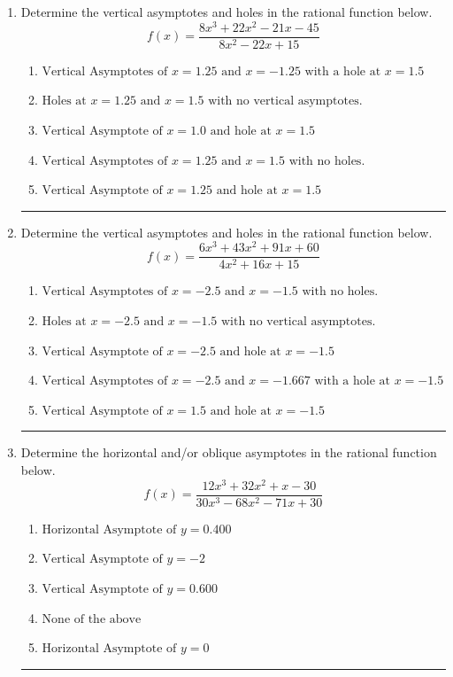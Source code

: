 \documentclass[14pt]{extbook}
\newcommand{\litem}[1]{\item#1\hspace*{-1cm}\rule{\textwidth}{0.4pt}}
\begin{document}
\begin{enumerate}
\litem{
Determine the vertical asymptotes and holes in the rational function below.\[ f(x) = \frac{8x^{3} +22 x^{2} -21 x -45}{8x^{2} -22 x + 15} \]\begin{enumerate}[label=\Alph*.]
\item \( \text{Vertical Asymptotes of } x = 1.25 \text{ and } x = -1.25 \text{ with a hole at } x = 1.5 \)
\item \( \text{Holes at } x = 1.25 \text{ and } x = 1.5 \text{ with no vertical asymptotes.} \)
\item \( \text{Vertical Asymptote of } x = 1.0 \text{ and hole at } x = 1.5 \)
\item \( \text{Vertical Asymptotes of } x = 1.25 \text{ and } x = 1.5 \text{ with no holes.} \)
\item \( \text{Vertical Asymptote of } x = 1.25 \text{ and hole at } x = 1.5 \)

\end{enumerate} }
\litem{
Determine the vertical asymptotes and holes in the rational function below.\[ f(x) = \frac{6x^{3} +43 x^{2} +91 x + 60}{4x^{2} +16 x + 15} \]\begin{enumerate}[label=\Alph*.]
\item \( \text{Vertical Asymptotes of } x = -2.5 \text{ and } x = -1.5 \text{ with no holes.} \)
\item \( \text{Holes at } x = -2.5 \text{ and } x = -1.5 \text{ with no vertical asymptotes.} \)
\item \( \text{Vertical Asymptote of } x = -2.5 \text{ and hole at } x = -1.5 \)
\item \( \text{Vertical Asymptotes of } x = -2.5 \text{ and } x = -1.667 \text{ with a hole at } x = -1.5 \)
\item \( \text{Vertical Asymptote of } x = 1.5 \text{ and hole at } x = -1.5 \)

\end{enumerate} }
\litem{
Determine the horizontal and/or oblique asymptotes in the rational function below.\[ f(x) = \frac{12x^{3} +32 x^{2} +x -30}{30x^{3} -68 x^{2} -71 x + 30} \]\begin{enumerate}[label=\Alph*.]
\item \( \text{Horizontal Asymptote of } y = 0.400  \)
\item \( \text{Vertical Asymptote of } y = -2  \)
\item \( \text{Vertical Asymptote of } y = 0.600  \)
\item \( \text{None of the above} \)
\item \( \text{Horizontal Asymptote of } y = 0  \)


\end{enumerate}}
\end{enumerate}
\end{document}
